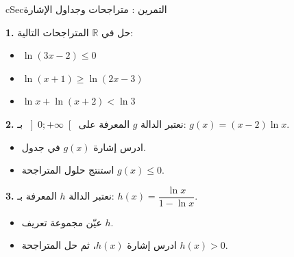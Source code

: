 \documentclass[12pt,a4paper]{article}
\newenvironment{BOX}[2]{\begin{otherlanguage}{english}\begin{arbox}{#1}{#2}}{\end{arbox}\end{otherlanguage}}
\newcounter{exo}
\newenvironment{tamrin}[1]{\stepcounter{exo}\begin{BOX}{cSec}{التمرين \theexo: #1}}{\end{BOX}}
\newcommand{\R}{\mathbb{R}}
\newenvironment{sq}{\begin{itemize}[leftmargin=2.4em,itemsep=3pt]}{\end{itemize}}
\newcommand{\qa}{\item[(أ)]}\newcommand{\qb}{\item[(ب)]}\newcommand{\qc}{\item[(جـ)]}\newcommand{\qd}{\item[(د)]}\newcommand{\qe}{\item[(هـ)]}
\newcommand{\QQ}[1]{\par\smallskip\textbf{#1.} }
\begin{document}
\begin{tamrin}{متراجحات وجداول الإشارة}
\QQ{1} حل في $\R$ المتراجحات التالية:
\begin{sq}
\qa $\ln(3x-2)\leq 0$
\qb $\ln(x+1)\geq\ln(2x-3)$
\qc $\ln x+\ln(x+2)<\ln 3$
\end{sq}
\QQ{2} نعتبر الدالة $g$ المعرفة على $\left]0;+\infty\right[$ بـ: $g(x)=(x-2)\ln x$.
\begin{sq}
\qa ادرس إشارة $g(x)$ في جدول.
\qb استنتج حلول المتراجحة $g(x)\leq 0$.
\end{sq}
\QQ{3} نعتبر الدالة $h$ المعرفة بـ: $h(x)=\dfrac{\ln x}{1-\ln x}$.
\begin{sq}
\qa عيّن مجموعة تعريف $h$.
\qb ادرس إشارة $h(x)$، ثم حل المتراجحة $h(x)>0$.
\end{sq}
\end{tamrin}
\end{document}
